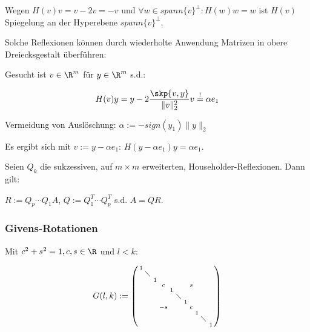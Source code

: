 Wegen $H(v)v=v-2v=-v$ und $\forall w \in spann\{v\}^\perp : H(w)w=w$ ist $H(v)$ Spiegelung an der Hyperebene $spann\{v\}^\perp$.

Solche Reflexionen können durch wiederholte Anwendung Matrizen in obere Dreiecksgestalt überführen:

\vspace{1mm}

Gesucht ist $v \in \R^m$ für $y \in \R^m$ s.d.:

\vspace{-2mm}
$$H(v)y=y - 2 \frac{\skp{v,y}}{\|v\|_2^2}v \overset{!}{=} \alpha e_1$$

Vermeidung von Auslöschung: $\alpha := -sign(y_1)\|y\|_2$

Es ergibt sich mit $v:=y-\alpha e_1$: $H(y-\alpha e_1)y=\alpha e_1$.

\vspace{1mm}

Seien $Q_k$ die sukzessiven, auf $m \times m$ erweiterten, Householder-Reflexionen. Dann gilt:

\vspace{1mm}

$R:=Q_p \cdots Q_1 A$, $Q:=Q_1^T \cdots Q_p^T$ s.d. $A=QR$.

\subsubsection*{Givens-Rotationen}

Mit $c^2 + s^2 = 1, c, s \in \R$ und $l < k$:

$$G(l,k) := \left(\begin{smallmatrix}
1 &           &   &    &   &           &   &   &   &           &   \\
  & \diagdown &   &    &   &           &   &   &   &           &   \\
  &           & 1 &    &   &           &   &   &   &           &   \\
  &           &   &  c &   &           &   & s &   &           &   \\
  &           &   &    & 1 &           &   &   &   &           &   \\
  &           &   &    &   & \diagdown &   &   &   &           &   \\
  &           &   &    &   &           & 1 &   &   &           &   \\
  &           &   & -s &   &           &   & c &   &           &   \\
  &           &   &    &   &           &   &   & 1 &           &   \\
  &           &   &    &   &           &   &   &   & \diagdown &   \\
  &           &   &    &   &           &   &   &   &           & 1
\end{smallmatrix}\right)$$

